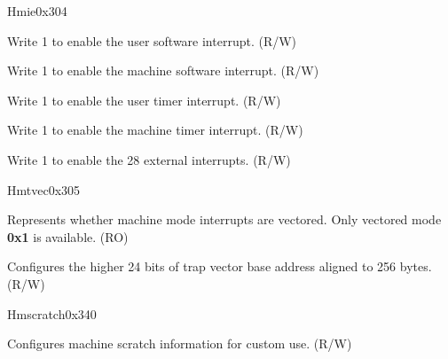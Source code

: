 \begin{register}{H}{mie}{0x304}\label{regdesc:MIE}
%
%
%
%
%
%
%
\regnewline%
\begin{regdesc}\begin{reglist}
\label{fielddesc:MIEUSIE}\item [USIE] Write 1 to enable the user software interrupt. (R/W)
\label{fielddesc:MIEMSIE}\item [MSIE] Write 1 to enable the machine software interrupt. (R/W)
\label{fielddesc:MIEUTIE}\item [UTIE] Write 1 to enable the user timer interrupt. (R/W)
\label{fielddesc:MIEMTIE}\item [MTIE] Write 1 to enable the machine timer interrupt. (R/W)
\label{fielddesc:MIEMXIE}\item [MXIE] Write 1 to enable the 28 external interrupts. (R/W)
\end{reglist}\end{regdesc}
\end{register}

\begin{register}{H}{mtvec}{0x305}\label{regdesc:MTVEC}
%
%
%
\regnewline%
\begin{regdesc}\begin{reglist}
\label{fielddesc:MTVECMODE}\item [MODE] Represents whether machine mode interrupts are vectored. Only vectored mode \textbf{0x1} is available. (RO)
\label{fielddesc:MTVECBASE}\item [BASE] Configures the higher 24 bits of trap vector base address aligned to 256 bytes. (R/W)
\end{reglist}\end{regdesc}
\end{register}

\begin{register}{H}{mscratch}{0x340}\label{regdesc:MSCRATCH}
%
\regnewline%
\begin{regdesc}\begin{reglist}
\label{fielddesc:MSCRATCH}\item [MSCRATCH] Configures machine scratch information for custom use. (R/W)
\end{reglist}\end{regdesc}
\end{register}

